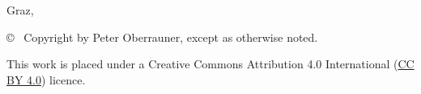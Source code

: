 \begin{center}
    \vspace{1cm}

    {\normalsize\sffamily Graz, \thisdate}



    \vfill

    {\footnotesize\sffamily \copyright ~ Copyright \thisyear by Peter Oberrauner,
        except as otherwise noted.}

    {\footnotesize\sffamily This work is placed under a
        Creative Commons Attribution 4.0 International
        (\href{https://creativecommons.org/licenses/by/4.0/}{CC BY 4.0}) licence.}


\end{center}






\cleardoublepage

